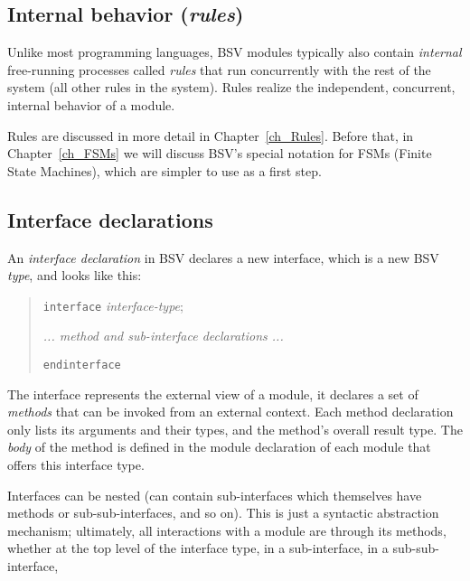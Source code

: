 
\subsection{Internal behavior (\emph{rules})}

\label{Sec_rules1}


Unlike most programming languages, BSV modules typically also contain
\emph{internal} free-running processes called \emph{rules} that run
concurrently with the rest of the system (all other rules in the
system).  Rules realize the independent, concurrent, internal behavior
of a module.

Rules are discussed in more detail in Chapter~\ref{ch_Rules}.  Before
that, in Chapter~\ref{ch_FSMs} we will discuss BSV's special notation
for FSMs (Finite State Machines), which are simpler to use as a first
step.


\subsection{Interface declarations}


An \emph{interface declaration} in BSV declares a new interface, which
is a new BSV \emph{type}, and looks like this:

\begin{quote}
{\tt interface} \emph{interface-type};

\hmm \emph{... method and sub-interface declarations ...}

{\tt endinterface}
\end{quote}

The interface represents the external view of a module, {\ie} it
declares a set of \emph{methods} that can be invoked from an external
context.  Each method declaration only lists its arguments and their
types, and the method's overall result type.  The \emph{body} of the
method is defined in the module declaration of each module that offers
this interface type.

Interfaces can be nested (can contain sub-interfaces which themselves
have methods or sub-sub-interfaces, and so on).  This is just a
syntactic abstraction mechanism; ultimately, all interactions with a
module are through its methods, whether at the top level of the
interface type, in a sub-interface, in a sub-sub-interface, {\etc}

